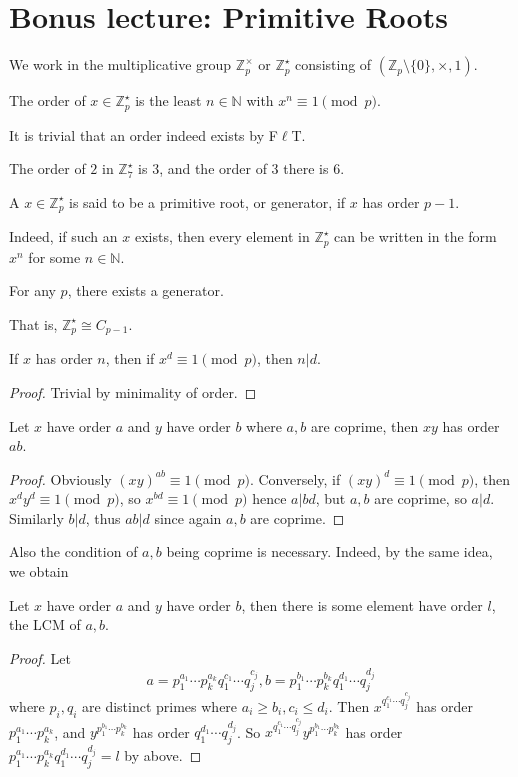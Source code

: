 \section{Bonus lecture: Primitive Roots}
We work in the multiplicative group $\mathbb Z_p^\times$ or $\mathbb Z_p^\star$ consisting of $(\mathbb Z_p\setminus\{0\},\times,1)$.
\begin{definition}
    The order of $x\in\mathbb Z_p^\star$ is the least $n\in\mathbb N$ with $x^n\equiv 1\pmod{p}$.
\end{definition}
It is trivial that an order indeed exists by F$\ell$T.
\begin{example}
    The order of $2$ in $\mathbb Z_7^\star$ is $3$, and the order of $3$ there is $6$.
\end{example}
\begin{definition}
    A $x\in \mathbb Z_p^\star$ is said to be a primitive root, or generator, if $x$ has order $p-1$.
\end{definition}
Indeed, if such an $x$ exists, then every element in $\mathbb Z_p^\star$ can be written in the form $x^n$ for some $n\in\mathbb N$.
\begin{theorem}\label{primitive}
    For any $p$, there exists a generator.
\end{theorem}
That is, $\mathbb Z_p^\star\cong C_{p-1}$.
\begin{proposition}
    If $x$ has order $n$, then if $x^d\equiv 1\pmod{p}$, then $n|d$.
\end{proposition}
\begin{proof}
    Trivial by minimality of order.
\end{proof}
\begin{proposition}
    Let $x$ have order $a$ and $y$ have order $b$ where $a,b$ are coprime, then $xy$ has order $ab$.
\end{proposition}
\begin{proof}
    Obviously $(xy)^{ab}\equiv 1\pmod{p}$.
    Conversely, if $(xy)^d\equiv 1\pmod{p}$, then $x^dy^d\equiv 1\pmod{p}$, so $x^{bd}\equiv 1\pmod{p}$ hence $a|bd$, but $a,b$ are coprime, so $a|d$.
    Similarly $b|d$, thus $ab|d$ since again $a,b$ are coprime.
\end{proof}
Also the condition of $a,b$ being coprime is necessary.
Indeed, by the same idea, we obtain
\begin{proposition}
    Let $x$ have order $a$ and $y$ have order $b$, then there is some element have order $l$, the LCM of $a,b$.
\end{proposition}
\begin{proof}
    Let
    $$a=p_1^{a_1}\cdots p_k^{a_k}q_1^{c_1}\cdots q_j^{c_j},b=p_1^{b_1}\cdots p_k^{b_k}q_1^{d_1}\cdots q_j^{d_j}$$
    where $p_i,q_i$ are distinct primes where $a_i\ge b_i,c_i\le d_i$.
    Then $x^{q_1^{c_1}\cdots q_j^{c_j}}$ has order $p_1^{a_1}\cdots p_k^{a_k}$, and $y^{p_1^{b_1}\cdots p_k^{b_k}}$ has order $q_1^{d_1}\cdots q_j^{d_j}$.
    So $x^{q_1^{c_1}\cdots q_j^{c_j}}y^{p_1^{b_1}\cdots p_k^{b_k}}$ has order $p_1^{a_1}\cdots p_k^{a_k}q_1^{d_1}\cdots q_j^{d_j}=l$ by above.
\end{proof}
